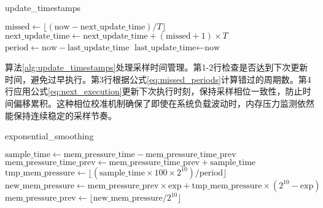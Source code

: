 \begin{algorithm}[htbp]
\caption{update\_timestamps}
\label{alg:update_timestamps}
\SetAlgoLined
\DontPrintSemicolon
{}
\(\text{missed} \gets \lfloor(\text{now}-\text{next\_update\_time})/T\rfloor\)\;
\(\text{next\_update\_time} \gets \text{next\_update\_time} + (\text{missed}+1) \times T\)\;
\(\text{period}\gets \text{now}-\text{last\_update\_time}\)\;
 \(\text{last\_update\_time}\gets \text{now}\)\;
\end{algorithm}

算法\ref{alg:update_timestamps}处理采样时间管理。第1-2行检查是否达到下次更新时间，避免过早执行。第3行根据公式\ref{eq:missed_periods}计算错过的周期数。第4行应用公式\ref{eq:next_execution}更新下次执行时刻，保持采样相位一致性，防止时间偏移累积。这种相位校准机制确保了即使在系统负载波动时，内存压力监测依然能保持连续稳定的采样节奏。
\begin{algorithm}[htbp]
\caption{exponential\_smoothing}
\label{alg:exponential_smoothing}
\SetAlgoLined
\DontPrintSemicolon
{}

\(\text{sample\_time}\gets \text{mem\_pressure\_time}-\text{mem\_pressure\_time\_prev}\)\;
\(\text{mem\_pressure\_time\_prev} \gets \text{mem\_pressure\_time\_prev} + \text{sample\_time}\)\;
\(\text{tmp\_mem\_pressure}\gets \lfloor(\text{sample\_time}\times 100\times 2^{10})/\text{period}\rfloor\)\;
\(\text{new\_mem\_pressure}\gets \text{mem\_pressure\_prev}\times \text{exp} + \text{tmp\_mem\_pressure}\times(2^{10}-\text{exp})\)\;
\(\text{mem\_pressure\_prev}\gets \lfloor \text{new\_mem\_pressure}/2^{10}\rfloor\)\;
\end{algorithm}

